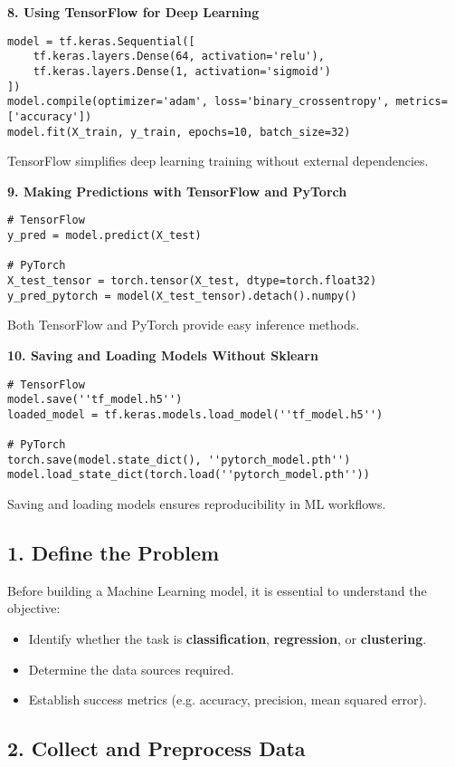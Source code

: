 \textbf{8. Using TensorFlow for Deep Learning}
\begin{verbatim}
model = tf.keras.Sequential([
    tf.keras.layers.Dense(64, activation='relu'),
    tf.keras.layers.Dense(1, activation='sigmoid')
])
model.compile(optimizer='adam', loss='binary_crossentropy', metrics=['accuracy'])
model.fit(X_train, y_train, epochs=10, batch_size=32)
\end{verbatim}
TensorFlow simplifies deep learning training without external dependencies.

\textbf{9. Making Predictions with TensorFlow and PyTorch}
\begin{verbatim}
# TensorFlow
y_pred = model.predict(X_test)

# PyTorch
X_test_tensor = torch.tensor(X_test, dtype=torch.float32)
y_pred_pytorch = model(X_test_tensor).detach().numpy()
\end{verbatim}
Both TensorFlow and PyTorch provide easy inference methods.

\textbf{10. Saving and Loading Models Without Sklearn}
\begin{verbatim}
# TensorFlow
model.save(''tf_model.h5'')
loaded_model = tf.keras.models.load_model(''tf_model.h5'')

# PyTorch
torch.save(model.state_dict(), ''pytorch_model.pth'')
model.load_state_dict(torch.load(''pytorch_model.pth''))
\end{verbatim}
Saving and loading models ensures reproducibility in ML workflows.

\subsection{1. Define the Problem}

Before building a Machine Learning model, it is essential to understand the objective:
\begin{itemize}
    \item Identify whether the task is \textbf{classification}, \textbf{regression}, or \textbf{clustering}.
    \item Determine the data sources required.
    \item Establish success metrics (e.g. accuracy, precision, mean squared error).
\end{itemize}

\subsection{2. Collect and Preprocess Data}

